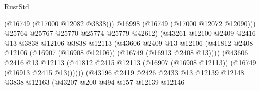 \begin{lexlean}{RustStd}
\begin{coremodule}
                                              (@16749 (@17000 @12082 @3838)))
                                            @16998
                                            (@16749 (@17000 @12072 @12090)))
                                          @25764
                                          @25767
                                          @25770
                                          @25774
                                          @25779
                                          @42612)
                                        (@43261
                                          @12100
                                          @2409
                                          @2416
                                          @13
                                          @3838
                                          @12106
                                          @3838
                                          @12113
                                          (@43606
                                            @2409
                                            @13
                                            @12106
                                            (@41812
                                              @2408
                                              @12106
                                              (@16907 (@16908 @12106))
                                              (@16749 (@16913 @2408 @13))))
                                          (@43606
                                            @2416
                                            @13
                                            @12113
                                            (@41812
                                              @2415
                                              @12113
                                              (@16907 (@16908 @12113))
                                              (@16749 (@16913 @2415 @13))))))
                                      (@43196
                                        @2419
                                        @2426
                                        @2433
                                        @13
                                        @12139
                                        @12148
                                        @3838
                                        @12163
                                        (@43207
                                          @200
                                          @494
                                          @157
                                          @12139
                                          @12146

\end{coremodule}
\end{lexlean}
